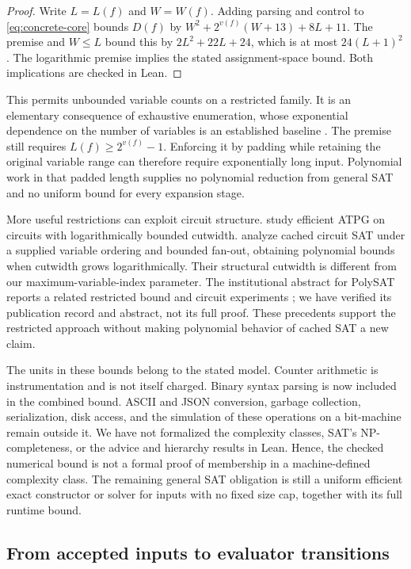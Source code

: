 \documentclass[11pt,a4paper]{article}
\numberwithin{equation}{section}
\theoremstyle{plain}
\theoremstyle{definition}
\theoremstyle{remark}
\begin{document}
\begin{proof}
Write $L=L(f)$ and $W=W(f)$. Adding parsing and control to \eqref{eq:concrete-core} bounds $D(f)$ by $W^2+2^{v(f)}(W+13)+8L+11$. The premise and $W\leq L$ bound this by $2L^2+22L+24$, which is at most $24(L+1)^2$. The logarithmic premise implies the stated assignment-space bound. Both implications are checked in Lean.
\end{proof}

This permits unbounded variable counts on a restricted family. It is an elementary consequence of exhaustive enumeration, whose exponential dependence on the number of variables is an established baseline \citep{paturi2005improved}. The premise still requires $L(f)\geq2^{v(f)}-1$. Enforcing it by padding while retaining the original variable range can therefore require exponentially long input. Polynomial work in that padded length supplies no polynomial reduction from general SAT and no uniform bound for every expansion stage.

More useful restrictions can exploit circuit structure. \citet{prasad2001atpg} study efficient ATPG on circuits with logarithmically bounded cutwidth. \citet{muller2024cutwidth} analyze cached circuit SAT under a supplied variable ordering and bounded fan-out, obtaining polynomial bounds when cutwidth grows logarithmically. Their structural cutwidth is different from our maximum-variable-index parameter. The institutional abstract for PolySAT reports a related restricted bound and circuit experiments \citep{muller2026polysat}; we have verified its publication record and abstract, not its full proof. These precedents support the restricted approach without making polynomial behavior of cached SAT a new claim.

The units in these bounds belong to the stated model. Counter arithmetic is instrumentation and is not itself charged. Binary syntax parsing is now included in the combined bound. ASCII and JSON conversion, garbage collection, serialization, disk access, and the simulation of these operations on a bit-machine remain outside it. We have not formalized the complexity classes, SAT's NP-completeness, or the advice and hierarchy results in Lean. Hence, the checked numerical bound is not a formal proof of membership in a machine-defined complexity class. The remaining general SAT obligation is still a uniform efficient exact constructor or solver for inputs with no fixed size cap, together with its full runtime bound.

\subsection{From accepted inputs to evaluator transitions}
\label{sec:evaluator-machine}
\end{document}
